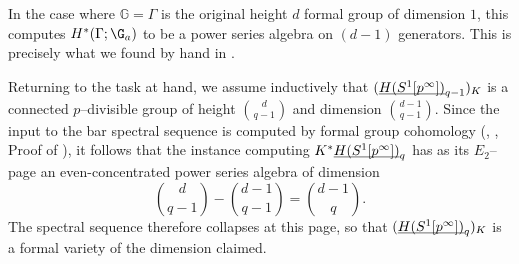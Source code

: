 \begin{remark}
In the case where \(\mathbb G = \Gamma\) is the original height \(d\) formal group of dimension \(1\), this computes \(H^*(\Gamma; \G_a)\) to be a power series algebra on \((d-1)\) generators.
This is precisely what we found by hand in .
\end{remark}

\noindent Returning to the task at hand, we assume inductively that \((\OS{H(S^1[p^\infty])}{q-1})_K\) is a connected \(p\)--divisible group of height \(\binom{d}{q-1}\) and dimension \(\binom{d-1}{q-1}\).
Since the input to the bar spectral sequence is computed by formal group cohomology (\cite{LazarevDeformations}, \cite[Example 2.3.5]{HopkinsLurie}, Proof of ), it follows that the instance computing \(K^* \OS{H(S^1[p^\infty])}{q}\) has as its \(E_2\)--page an even-concentrated power series algebra of dimension \[\binom{d}{q-1} - \binom{d-1}{q-1} = \binom{d-1}{q}.\]
The spectral sequence therefore collapses at this page, so that \((\OS{H(S^1[p^\infty])}{q})_K\) is a formal variety of the dimension claimed.

